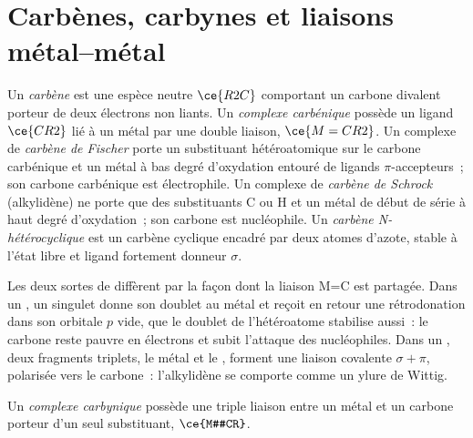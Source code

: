 \section{Carbènes, carbynes et liaisons métal--métal}

\begin{definition}\label{def:b3:organometallic-bonding:carbene}
Un \emph{carbène} est une espèce neutre $\ce{R2C}$ comportant un carbone
divalent porteur de deux électrons non liants. Un \emph{complexe carbénique}
possède un ligand $\ce{CR2}$ lié à un métal par une double liaison, $\ce{M=CR2}$. Un complexe
de \emph{carbène de Fischer} porte un substituant hétéroatomique sur le
carbone carbénique et un métal à bas degré d'oxydation entouré de ligands $\pi$-accepteurs~; son carbone
carbénique est électrophile. Un complexe de \emph{carbène de Schrock}
(alkylidène) ne porte que des substituants C ou H et un métal de début de
série à haut degré d'oxydation~; son carbone est nucléophile. Un \emph{carbène N-hétérocyclique} est un
carbène cyclique encadré par deux atomes d'azote, stable à l'état libre et
ligand fortement donneur
$\sigma$.
\end{definition}

Les deux sortes de  diffèrent par la façon dont la
liaison M=C est partagée. Dans un , un  singulet
donne son doublet au métal et reçoit en retour une rétrodonation dans son
orbitale $p$ vide, que le doublet de l'hétéroatome stabilise aussi~: le
carbone reste pauvre en électrons et subit l'attaque des nucléophiles. Dans
un , deux fragments triplets, le métal et le ,
forment une liaison covalente $\sigma +
\pi$, polarisée vers le carbone~: l'alkylidène se comporte comme un ylure de Wittig.

\begin{definition}\label{def:b3:organometallic-bonding:carbyne}
Un \emph{complexe carbynique} possède une triple
liaison entre un métal et un carbone porteur d'un seul substituant, $\ce{M#CR}$.
\end{definition}

